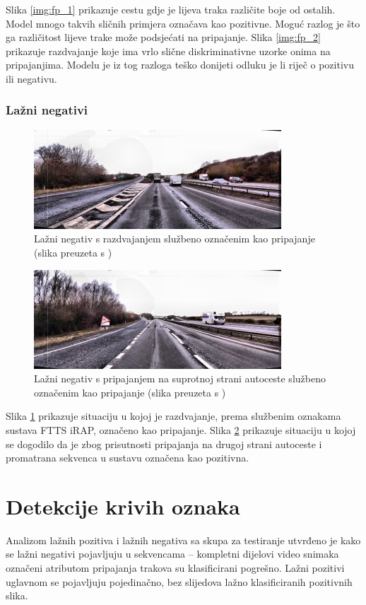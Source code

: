 \documentclass[times, utf8, diplomski, numeric]{fer}
\begin{document}
Slika \ref{img:fp_1} prikazuje cestu gdje je lijeva traka različite boje od ostalih. 
Model mnogo takvih sličnih primjera označava kao pozitivne. Moguć razlog je što ga različitost lijeve trake može podsjećati na pripajanje.
Slika \ref{img:fp_2} prikazuje razdvajanje koje ima vrlo slične diskriminativne uzorke onima na pripajanjima. 
Modelu je iz tog razloga teško donijeti odluku je li riječ o pozitivu ili negativu.

\subsubsection{Lažni negativi }
\begin{figure}[H]
\centering
\includegraphics[scale=1]{images/fn_1.png}
\caption{Lažni negativ s razdvajanjem službeno označenim kao pripajanje (slika preuzeta s \citep{url:ftts_irap})}
\label{img:fn_1}
\end{figure}

\begin{figure}[H]
\centering
\includegraphics[scale=1]{images/fn_2.png}
\caption{Lažni negativ s pripajanjem na suprotnoj strani autoceste službeno označenim kao pripajanje (slika preuzeta s \citep{url:ftts_irap})}
\label{img:fn_2}
\end{figure}

Slika \ref{img:fn_1} prikazuje situaciju u kojoj je razdvajanje, prema službenim oznakama sustava FTTS iRAP, označeno kao pripajanje. 
Slika \ref{img:fn_2} prikazuje situaciju u kojoj se dogodilo da je zbog prisutnosti pripajanja na drugoj strani autoceste i promatrana sekvenca u sustavu označena kao pozitivna.

\section{Detekcije krivih oznaka}
Analizom lažnih pozitiva i lažnih negativa sa skupa za testiranje utvrđeno je kako se lažni negativi pojavljuju u sekvencama -- kompletni dijelovi video snimaka označeni atributom pripajanja trakova su klasificirani pogrešno.
Lažni pozitivi uglavnom se pojavljuju pojedinačno, bez slijedova lažno klasificiranih pozitivnih slika.
\end{document}
